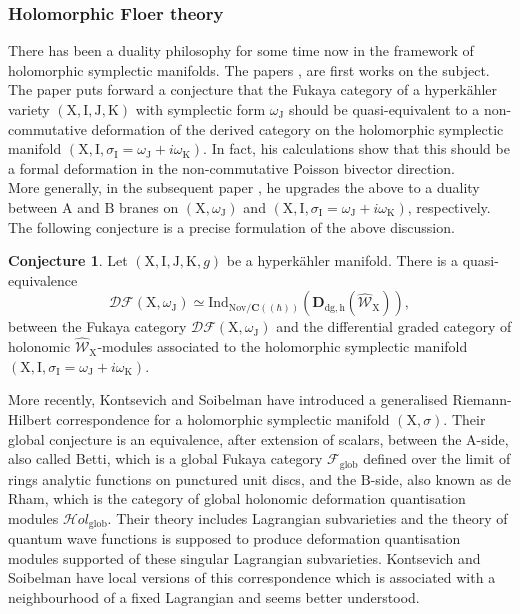\documentclass{article}
\theoremstyle{plain}
\theoremstyle{definition}
\newtheorem{conjecture}[theorem]{Conjecture}
\theoremstyle{remark}
\newcommand{\mr}{\mathrm}
\newcommand{\C}{\mathbf C}
\newcommand{\cbrak}{(\!(\hbar)\!)}
\newcommand{\3}{\vspace{3mm}}
\newcommand{\2}{\vspace{2mm}}
\newcommand{\1}{\vspace{1mm}}
\begin{document}
\subsubsection{Holomorphic Floer theory}
There has been a duality philosophy for some time now in the framework of holomorphic symplectic manifolds. The papers \cite{2004IJGMM..01...49K}, \cite{Kapustin2005AbranesAN} are first works on the subject.
The paper \cite{2004IJGMM..01...49K} puts forward a conjecture that the Fukaya category of a hyperkähler variety $(\mr{X},\mr{I,J,K})$ with symplectic form $\omega_\mr{J}$ should be quasi-equivalent to a non-commutative deformation of the derived category on the holomorphic symplectic manifold $(\mr{X},\mr{I},\sigma_\mr{I} = \omega_\mr{J}+i\omega_\mr{K})$. In fact, his calculations show that this should be a formal deformation in the non-commutative Poisson bivector direction.\\ More generally, in the subsequent paper \cite{Kapustin2005AbranesAN}, he upgrades the above to a duality between $\mr{A}$ and $\mr{B}$ branes on $(\mr{X},\omega_\mr{J})$ and $(\mr{X},\mr{I},\sigma_\mr{I} = \omega_\mr{J}+i\omega_\mr{K})$, respectively. The following conjecture is a precise formulation of the above discussion.
\2
\begin{conjecture}\label{swdconj}
 Let $(\mr{X},\mr{I,J,K},g)$ be a hyperkähler manifold. There is a quasi-equivalence $$\mathcal{DF}(\mr{X},\omega_\mr{J}) \simeq \mr{Ind}_{\mr{Nov}/\C\cbrak}\left(\mathbf{D}_\mr{dg,h}(\widehat{\mathscr{W}}_\mr{X})\right),$$ between the Fukaya category $\mathcal{DF}(\mr{X},\omega_\mr{J})$ and the differential graded category of holonomic $\widehat{\mathscr{W}}_\mr{X}$-modules associated to the holomorphic symplectic manifold $(\mr{X},\mr{I},\sigma_\mr{I} = \omega_\mr{J}+i\omega_\mr{K})$.
\end{conjecture} 
More recently, Kontsevich and Soibelman \cite{hft} have introduced a generalised Riemann-Hilbert correspondence for a holomorphic symplectic manifold $(\mr{X},\sigma)$. Their global conjecture is an equivalence, after extension of scalars, between the $\mr{A}$-side, also called Betti, which is a global Fukaya category $\mathcal{F}_\mr{glob}$ defined over the limit of rings analytic functions on punctured unit discs, and the $\mr{B}$-side, also known as de Rham, which is the category of global holonomic deformation quantisation modules $\mathcal{H}ol_\mr{glob}$. Their theory includes Lagrangian subvarieties and the theory of quantum wave functions is supposed to produce deformation quantisation modules supported of these singular Lagrangian subvarieties. Kontsevich and Soibelman have local versions of this correspondence which is associated with a neighbourhood of a fixed Lagrangian and seems better understood.
\end{document}
